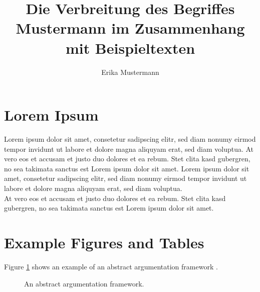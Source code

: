 \documentclass[f,bachelor,palatino,twoside,binding]{AIGpaper}
\author{Erika Mustermann}
\title{Die Verbreitung des Begriffes \glqq{}Mustermann\grqq{} im Zusammenhang mit Beispieltexten}
\begin{document}
\maketitle%


\tableofcontents%
\cleardoublepage%





\section{Lorem Ipsum}
Lorem ipsum dolor sit amet, consetetur sadipscing elitr, sed diam nonumy eirmod tempor invidunt ut labore et dolore magna aliquyam erat, sed diam voluptua. At vero eos et accusam et justo duo dolores et ea rebum. Stet clita kasd gubergren, no sea takimata sanctus est Lorem ipsum dolor sit amet. Lorem ipsum dolor sit amet, consetetur sadipscing elitr, sed diam nonumy eirmod tempor invidunt ut labore et dolore magna aliquyam erat, sed diam voluptua.\\
At vero eos et accusam et justo duo dolores et ea rebum. Stet clita kasd gubergren, no sea takimata sanctus est Lorem ipsum dolor sit amet.


\section{Example Figures and Tables}

Figure \ref{fig:af} shows an example of an abstract argumentation framework \cite{dung1995acceptability}.

\begin{figure}[ht]
    \centering
    \caption{An abstract argumentation framework.}
    \label{fig:af}
\end{figure}
\end{document}

